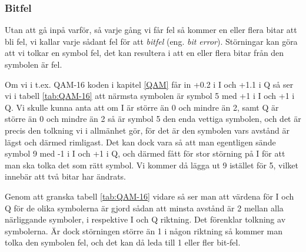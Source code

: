 \subsubsection{Bitfel}
\begin{rev-nytt}[MAD]

Utan att gå inpå varför, så varje gång vi får fel så kommer en eller flera
bitar att bli fel, vi kallar varje sådant fel för att \emph{bitfel} (eng.
\emph{bit error}). Störningar kan göra att vi tolkar en symbol fel, det kan
resultera i att en eller flera bitar från den symbolen är fel.

Om vi i t.ex. QAM-16 koden i kapitel \ref{QAM} får in +0.2 i I och +1.1 i Q
så ser vi i tabell \ref{tab:QAM-16} att närmsta symbolen är symbol 5 med +1 i I
och +1 i Q. Vi skulle kunna anta att om I är större än 0 och mindre än 2, samt
Q är större än 0 och mindre än 2 så är symbol 5 den enda vettiga symbolen, och
det är precis den tolkning vi i allmänhet gör, för det är den symbolen vars
avstånd är lägst och därmed rimligast. Det kan dock vara så att man egentligen
sände symbol 9 med -1 i I och +1 i Q, och därmed fått för stor störning på I
för att man ska tolka det som rätt symbol. Vi kommer då lägga ut 9 istället
för 5, vilket innebär att två bitar har ändrats.

Genom att granska tabell \ref{tab:QAM-16} vidare så ser man att värdena för
I och Q för de olika symbolerna är gjord sådan att minsta avstånd är 2 mellan
alla närliggande symboler, i respektive I och Q riktning. Det förenklar
tolkning av symbolerna. Är dock störningen större än 1 i någon riktning så
kommer man tolka den symbolen fel, och det kan då leda till 1 eller fler
bit-fel.

\end{rev-nytt}

